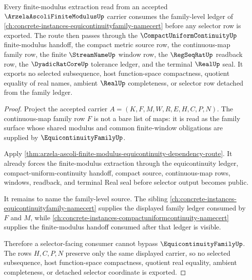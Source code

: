 \begin{theorem}
\label{thm:arzela-ascoli-equicontinuity-family-dependency-route}
Every finite-modulus extraction read from an accepted $\ArzelaAscoliFiniteModulusUp$ carrier consumes the family-level ledger of \autoref{ch:concrete-instances-equicontinuityfamily-namecert} before any selector row is exported. The route then passes through the $\CompactUniformContinuityUp$ finite-modulus handoff, the compact metric source row, the continuous-map family row, the finite $\StreamNameUp$ window row, the $\RegSeqRatUp$ readback row, the $\DyadicRatCoreUp$ tolerance ledger, and the terminal $\RealUp$ seal. It exports no selected subsequence, host function-space compactness, quotient equality of real names, ambient $\RealUp$ completeness, or selector row detached from the family ledger.
\end{theorem}
\begin{proof}
Project the accepted carrier $A=(K,F,M,W,R,E,H,C,P,N)$. The continuous-map family row $F$ is not a bare list of maps: it is read as the family surface whose shared modulus and common finite-window obligations are supplied by $\EquicontinuityFamilyUp$.

Apply \autoref{thm:arzela-ascoli-finite-modulus-equicontinuity-dependency-route}. It already forces the finite-modulus extraction through the equicontinuity ledger, compact-uniform-continuity handoff, compact source, continuous-map rows, windows, readback, and terminal Real seal before selector output becomes public.

It remains to name the family-level source. The sibling \autoref{ch:concrete-instances-equicontinuityfamily-namecert} supplies the displayed family ledger consumed by $F$ and $M$, while \autoref{ch:concrete-instances-compactuniformcontinuity-namecert} supplies the finite-modulus handoff consumed after that ledger is visible.

Therefore a selector-facing consumer cannot bypass $\EquicontinuityFamilyUp$. The rows $H,C,P,N$ preserve only the same displayed carrier, so no selected subsequence, host function-space compactness, quotient real equality, ambient completeness, or detached selector coordinate is exported.
\end{proof}
